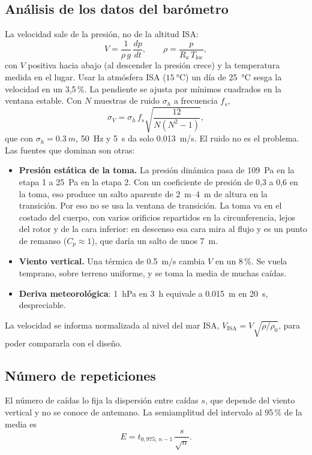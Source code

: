\subsection{Análisis de los datos del barómetro}
La velocidad sale de la presión, no de la altitud ISA:
\begin{equation}
  V = \frac{1}{\rho\,g}\,\frac{dp}{dt}, \qquad \rho = \frac{p}{R_a\,T_\text{loc}},
  \label{eq:ensayos-baro}
\end{equation}
con $V$ positiva hacia abajo (al descender la presión crece) y la temperatura medida en
el lugar. Usar la atmósfera ISA ($\SI{15}{\celsius}$) un día
de \SI{25}{\celsius} sesga la velocidad en un 3,5\,\%. La pendiente se ajusta por
mínimos cuadrados en la ventana estable. Con $N$ muestras de ruido $\sigma_h$ a frecuencia
$f_s$,
\begin{equation}
  \sigma_V = \sigma_h\,f_s\sqrt{\frac{12}{N(N^2-1)}},
  \label{eq:ensayos-sigmaV}
\end{equation}
que con $\sigma_h=\SI{0.3}{m}$, \SI{50}{Hz} y \SI{5}{s} da solo \SI{0.013}{m/s}. El ruido
no es el problema. Las fuentes que dominan son otras:
\begin{itemize}
  \item \textbf{Presión estática de la toma.} La presión dinámica pasa de \SI{109}{Pa} en
        la etapa 1 a \SI{25}{Pa} en la etapa 2. Con un coeficiente de presión de 0,3 a 0,6
        en la toma, eso produce un salto aparente de \SIrange{2}{4}{m} de altura en la
        transición. Por eso no se usa la ventana de transición. La toma va en el costado
        del cuerpo, con varios orificios repartidos en la circunferencia, lejos del rotor y
        de la cara inferior: en descenso esa cara mira al flujo y es un punto de remanso
        ($C_p\approx1$), que daría un salto de unos \SI{7}{m}.
  \item \textbf{Viento vertical.} Una térmica de \SI{0.5}{m/s} cambia $V$ en un 8\,\%.
        Se vuela temprano, sobre terreno uniforme, y se toma la media de muchas caídas.
  \item \textbf{Deriva meteorológica}: \SI{1}{hPa} en \SI{3}{h} equivale a
        \SI{0.015}{m} en \SI{20}{s}, despreciable.
\end{itemize}
La velocidad se informa normalizada al nivel del mar ISA,
$V_\text{ISA}=V\sqrt{\rho/\rho_0}$, para poder compararla con el diseño.

\subsection{Número de repeticiones}\label{sec:ensayos-n}
El número de caídas lo fija la dispersión entre caídas $s$, que depende del viento
vertical y no se conoce de antemano. La semiamplitud del intervalo al 95\,\% de la media es
\begin{equation}
  E = t_{0{,}975;\,n-1}\,\frac{s}{\sqrt n}.
  \label{eq:ensayos-E}
\end{equation}

